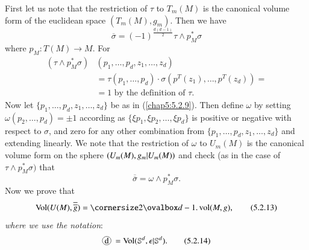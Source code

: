 First let us note that the restriction of $\tau$ to $T_{m}(M)$ is the
canonical volume form of the euclidean space
$(T_{m}(M),g_{m})$. Then \pageoriginale we have
\begin{equation*}
\overline{\sigma}=(-1)^{\frac{d(d-1)}{2}}\tau\wedge
p^{\ast}_{M}\sigma\tag{5.2.11}\label{chap5:5.2.11} 
\end{equation*}
where $p_{M}:T(M)\to M$. For
\begin{align*}
(\tau\wedge p^{\ast}_{M}\sigma)&(p_{1},\ldots,p_{d},z_{1},\ldots,z_{d})\\
&=\tau(p_{1},\ldots,p_{d})\cdot\sigma(p^{T}(z_{1}),\ldots,p^{T}(z_{d}))=\\
&= \text{1 by the definition of $\tau$.}
\end{align*}
Now let $\{p_{1},\ldots,p_{d},z_{1},\ldots,z_{d}\}$ be as in
(\ref{chap5:5.2.9}). Then define $\omega$ by setting
$\omega(p_{2},\ldots,p_{d})=\pm 1$ according as $\{\xi p_{1},\xi
p_{2},\ldots,\xi p_{d}\}$ is positive or negative with respect to
$\sigma$, and zero for any other combination from
$\{p_{1},\ldots,p_{d},z_{1},\ldots,z_{d}\}$ and extending linearly. We
note that the restriction of $\omega$ to $U_{m}(M)$ is the canonical
volume form on the sphere $(U_{m}(M),\unskip\break g_{m}|U_{m}(M))$ and check (as in
the case of $\tau\wedge p^{\ast}_{M}\sigma)$ that
\begin{equation*}
\overline{\overline{\sigma}}=\omega\wedge
p^{\ast}_{M}\sigma.\tag{5.2.12}\label{chap5:5.2.12} 
\end{equation*}
Now we prove that
\begin{equation*}
\Vol(U(M),\overline{\overline{g}})=\oval{d-1}.\vol
(M,g),\tag{5.2.13}\label{chap5:5.2.13} 
\end{equation*}
{\em where we use the notation}:
\begin{equation*}
\mycirc{d}=\Vol(\mathbb{S}^{d},\epsilon|\mathbb{S}^{d}).\tag{5.2.14}\label{chap5:5.2.14}
\end{equation*}

